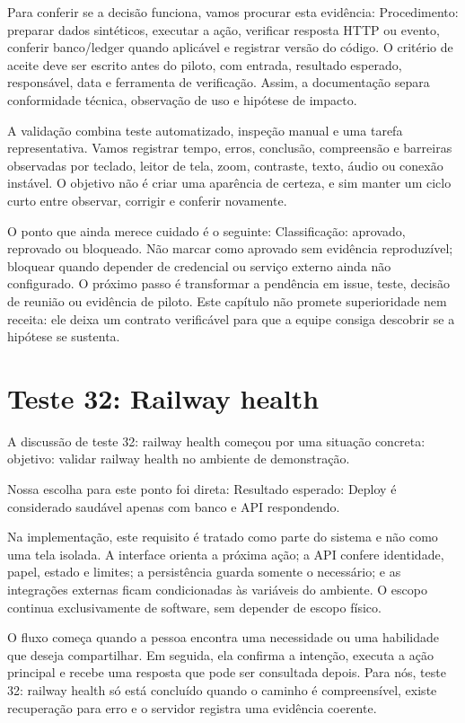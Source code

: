 \documentclass[12pt,oneside,a4paper,article]{abntex2}
\begin{document}
Para conferir se a decisão funciona, vamos procurar esta evidência: Procedimento: preparar dados sintéticos, executar a ação, verificar resposta HTTP ou evento, conferir banco/ledger quando aplicável e registrar versão do código. O critério de aceite deve ser escrito antes do piloto, com entrada, resultado esperado, responsável, data e ferramenta de verificação. Assim, a documentação separa conformidade técnica, observação de uso e hipótese de impacto.

A validação combina teste automatizado, inspeção manual e uma tarefa representativa. Vamos registrar tempo, erros, conclusão, compreensão e barreiras observadas por teclado, leitor de tela, zoom, contraste, texto, áudio ou conexão instável. O objetivo não é criar uma aparência de certeza, e sim manter um ciclo curto entre observar, corrigir e conferir novamente.

O ponto que ainda merece cuidado é o seguinte: Classificação: aprovado, reprovado ou bloqueado. Não marcar como aprovado sem evidência reproduzível; bloquear quando depender de credencial ou serviço externo ainda não configurado. O próximo passo é transformar a pendência em issue, teste, decisão de reunião ou evidência de piloto. Este capítulo não promete superioridade nem receita: ele deixa um contrato verificável para que a equipe consiga descobrir se a hipótese se sustenta.

\section{Teste 32: Railway health}
A discussão de teste 32: railway health começou por uma situação concreta: objetivo: validar railway health no ambiente de demonstração.

Nossa escolha para este ponto foi direta: Resultado esperado: Deploy é considerado saudável apenas com banco e API respondendo.

Na implementação, este requisito é tratado como parte do sistema e não como uma tela isolada. A interface orienta a próxima ação; a API confere identidade, papel, estado e limites; a persistência guarda somente o necessário; e as integrações externas ficam condicionadas às variáveis do ambiente. O escopo continua exclusivamente de software, sem depender de escopo físico.

O fluxo começa quando a pessoa encontra uma necessidade ou uma habilidade que deseja compartilhar. Em seguida, ela confirma a intenção, executa a ação principal e recebe uma resposta que pode ser consultada depois. Para nós, teste 32: railway health só está concluído quando o caminho é compreensível, existe recuperação para erro e o servidor registra uma evidência coerente.
\end{document}
